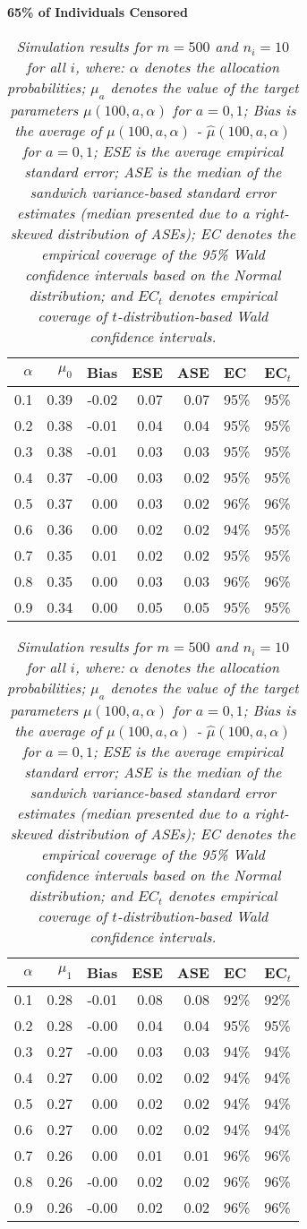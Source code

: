 \documentclass[12pt, letterpaper]{article}
\begin{document}
\clearpage

\begin{center}
	\textbf{65\% of Individuals Censored} 
\end{center}
\begin{table}[ht!]
	\centering
	\bgroup
	\def\arraystretch{1.25}
	\setlength\tabcolsep{0.05in}
	\begin{tabular}{rrrrrll}
		\hline
		$\alpha$ & $\mu_0$ & Bias & ESE & ASE & EC & EC$_t$ \\ \hline
0.1 & 0.39 & -0.02 & 0.07 & 0.07 & 95\% & 95\% \\ 
0.2 & 0.38 & -0.01 & 0.04 & 0.04 & 95\% & 95\% \\ 
0.3 & 0.38 & -0.01 & 0.03 & 0.03 & 95\% & 95\% \\ 
0.4 & 0.37 & -0.00 & 0.03 & 0.02 & 95\% & 95\% \\ 
0.5 & 0.37 & 0.00 & 0.03 & 0.02 & 96\% & 96\% \\ 
0.6 & 0.36 & 0.00 & 0.02 & 0.02 & 94\% & 95\% \\ 
0.7 & 0.35 & 0.01 & 0.02 & 0.02 & 95\% & 95\% \\ 
0.8 & 0.35 & 0.00 & 0.03 & 0.03 & 96\% & 96\% \\ 
0.9 & 0.34 & 0.00 & 0.05 & 0.05 & 95\% & 95\% \\ 
		\hline
	\end{tabular}
	\egroup
	\quad 
	\bgroup
	\setlength\tabcolsep{0.05in}
	\def\arraystretch{1.25}
	\begin{tabular}{rrrrrll}
		\hline
		$\alpha$ & $\mu_1$ & Bias & ESE & ASE & EC & EC$_t$ \\ \hline
	0.1 & 0.28 & -0.01 & 0.08 & 0.08 & 92\% & 92\% \\ 
	0.2 & 0.28 & -0.00 & 0.04 & 0.04 & 95\% & 95\% \\ 
	0.3 & 0.27 & -0.00 & 0.03 & 0.03 & 94\% & 94\% \\ 
	0.4 & 0.27 & 0.00 & 0.02 & 0.02 & 94\% & 94\% \\ 
	0.5 & 0.27 & 0.00 & 0.02 & 0.02 & 94\% & 94\% \\ 
	0.6 & 0.27 & 0.00 & 0.02 & 0.02 & 94\% & 94\% \\ 
	0.7 & 0.26 & 0.00 & 0.01 & 0.01 & 96\% & 96\% \\ 
	0.8 & 0.26 & -0.00 & 0.02 & 0.02 & 96\% & 96\% \\ 
	0.9 & 0.26 & -0.00 & 0.02 & 0.02 & 96\% & 96\% \\
		\hline
	\end{tabular}
	\egroup
	\caption*{\textit{Simulation results for $m = 500$ and $n_i = 10$ for all $i$, where: $\alpha$ denotes the allocation probabilities; $\mu_a$ denotes the value of the target parameters $\mu(100, a, \alpha)$ for $a=0,1$; Bias is the average of $\mu(100, a, \alpha)$ - $\hat{\mu}(100, a, \alpha)$ for $a=0, 1$; ESE is the average empirical standard error; ASE is the median of the sandwich variance-based standard error estimates (median presented due to a right-skewed distribution of ASEs); EC denotes the empirical coverage of the 95\% Wald confidence intervals based on the Normal distribution; and $EC_t$ denotes empirical coverage of $t$-distribution-based Wald confidence intervals.} \\
		
}
\end{table}
\end{document}
